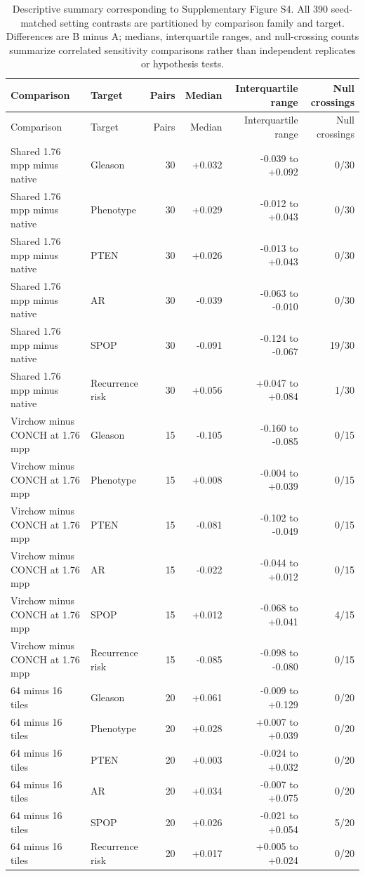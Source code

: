 \begingroup
\small
\setlength{\tabcolsep}{3pt}
\begin{longtable}{@{}p{}p{}rrrr@{}}
\caption{Descriptive summary corresponding to Supplementary Figure S4. All 390 seed-matched setting contrasts are partitioned by comparison family and target. Differences are B minus A; medians, interquartile ranges, and null-crossing counts summarize correlated sensitivity comparisons rather than independent replicates or hypothesis tests.}
\label{tab:supp-stability-contrast-summary}\\
\toprule
Comparison & Target & Pairs & Median & Interquartile range & Null crossings \\
\midrule
\endfirsthead
\toprule
Comparison & Target & Pairs & Median & Interquartile range & Null crossings \\
\midrule
\endhead
Shared 1.76 mpp minus native & Gleason & 30 & +0.032 & -0.039 to +0.092 & 0/30 \\
Shared 1.76 mpp minus native & Phenotype & 30 & +0.029 & -0.012 to +0.043 & 0/30 \\
Shared 1.76 mpp minus native & PTEN & 30 & +0.026 & -0.013 to +0.043 & 0/30 \\
Shared 1.76 mpp minus native & AR & 30 & -0.039 & -0.063 to -0.010 & 0/30 \\
Shared 1.76 mpp minus native & SPOP & 30 & -0.091 & -0.124 to -0.067 & 19/30 \\
Shared 1.76 mpp minus native & Recurrence risk & 30 & +0.056 & +0.047 to +0.084 & 1/30 \\
Virchow minus CONCH at 1.76 mpp & Gleason & 15 & -0.105 & -0.160 to -0.085 & 0/15 \\
Virchow minus CONCH at 1.76 mpp & Phenotype & 15 & +0.008 & -0.004 to +0.039 & 0/15 \\
Virchow minus CONCH at 1.76 mpp & PTEN & 15 & -0.081 & -0.102 to -0.049 & 0/15 \\
Virchow minus CONCH at 1.76 mpp & AR & 15 & -0.022 & -0.044 to +0.012 & 0/15 \\
Virchow minus CONCH at 1.76 mpp & SPOP & 15 & +0.012 & -0.068 to +0.041 & 4/15 \\
Virchow minus CONCH at 1.76 mpp & Recurrence risk & 15 & -0.085 & -0.098 to -0.080 & 0/15 \\
64 minus 16 tiles & Gleason & 20 & +0.061 & -0.009 to +0.129 & 0/20 \\
64 minus 16 tiles & Phenotype & 20 & +0.028 & +0.007 to +0.039 & 0/20 \\
64 minus 16 tiles & PTEN & 20 & +0.003 & -0.024 to +0.032 & 0/20 \\
64 minus 16 tiles & AR & 20 & +0.034 & -0.007 to +0.075 & 0/20 \\
64 minus 16 tiles & SPOP & 20 & +0.026 & -0.021 to +0.054 & 5/20 \\
64 minus 16 tiles & Recurrence risk & 20 & +0.017 & +0.005 to +0.024 & 0/20 \\
\bottomrule
\end{longtable}
\endgroup
